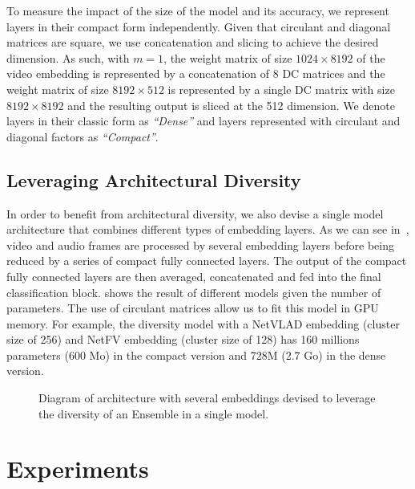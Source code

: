To measure the impact of the size of the model and its accuracy, we represent layers in their compact form independently.
Given that circulant and diagonal matrices are square, we use concatenation and slicing to achieve the desired dimension.
As such, with $m=1$, the weight matrix of size $1024 \times 8192$ of the video embedding is represented by a concatenation of 8 DC matrices and the weight matrix of size $8192 \times 512$ is represented by a single DC matrix with size $8192 \times 8192$ and the resulting output is sliced at the 512 dimension.
We denote layers in their classic form as \emph{``Dense''} and layers represented with circulant and diagonal factors as \emph{``Compact''}.

\subsection{Leveraging Architectural Diversity}
\label{subsection:ap2-leveraging_architectural_diversity}

In order to benefit from architectural diversity, we also devise a single model architecture that combines different types of embedding layers.
As we can see in~, video and audio frames are processed by several embedding layers before being reduced by a series of compact fully connected layers.
The output of the compact fully connected layers are then averaged, concatenated and fed into the final classification block.
 shows the result of different models given the number of parameters.
The use of circulant matrices allow us to fit this model in GPU memory.
For example, the diversity model with a NetVLAD embedding (cluster size of 256) and NetFV embedding (cluster size of 128) has 160 millions parameters (600 Mo) in the compact version and 728M (2.7 Go) in the dense version. 

\begin{figure}[ht]
  \centering
  
  \caption{Diagram of architecture with several embeddings devised to leverage the diversity of an Ensemble in a single model.}
  \label{figure:ap2-diverstiy_architecture}
\end{figure}

\section{Experiments}
\label{section:ap2-experiments}

